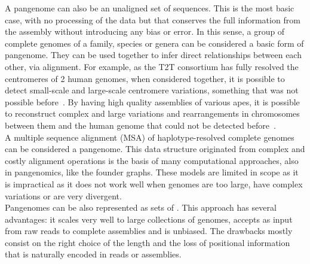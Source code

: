 A pangenome can also be an unaligned set of sequences. This is the most basic case, with no processing of the data but that conserves the full information from the assembly without introducing any bias or error. In this sense, a group of complete genomes of a family, species or genera can be considered a basic form of pangenome. They can be used together to infer direct relationships between each other, via alignment. For example, as the T2T consortium has fully resolved the centromeres of 2 human genomes, when considered together, it is possible to detect small-scale and large-scale centromere variations, something that was not possible before~\cite{centromeres_eichler}. By having high quality assemblies of various apes, it is possible to reconstruct complex and large variations and rearrangements in chromosomes between them and the human genome that could not be detected before~\cite{apes_genomes}.\\
A multiple sequence alignment (MSA) of haplotype-resolved complete genomes can be considered a pangenome. This data structure originated from complex and costly alignment operations is the basis of many computational approaches, also in pangenomics, like the founder graphs. These models are limited in scope as it is impractical as it does not work well when genomes are too large, have complex variations or are very divergent.\\
Pangenomes can be also represented as sets of \kmers. This approach has several advantages: it scales very well to large collections of genomes, accepts as input from raw reads to complete assemblies and is unbiased. The drawbacks mostly consist on the right choice of the \kmer length and the loss of positional information that is naturally encoded in reads or assemblies.

